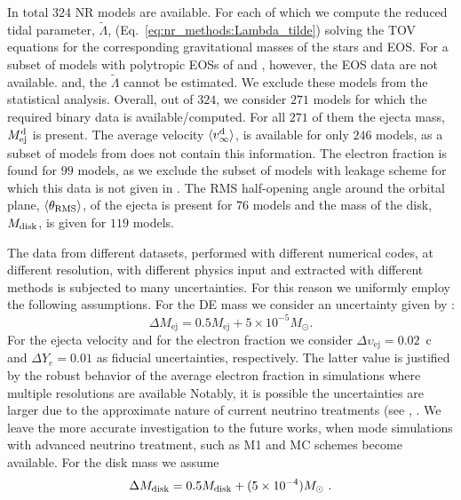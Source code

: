 In total $324$ \ac{NR} models are available.
For each of which we compute the reduced tidal parameter, $\tilde{\Lambda}$, 
(Eq.~\eqref{eq:nr_methods:Lambda_tilde}) solving the \ac{TOV} equations for the corresponding 
gravitational masses of the stars and \ac{EOS}.
% 
For a subset of models with polytropic \acp{EOS} of \citet{Bauswein:2013jpa}
and \citet{Kiuchi:2019lls}, however, the \ac{EOS} data are not available. and, 
the $\tilde{\Lambda}$ cannot be estimated. We exclude these models from the 
statistical analysis. Overall, out of $324$, we consider $271$ models for which 
the required binary data is available/computed. For all $271$ of them the ejecta 
mass, $M^{\text{d}}_{\text{ej}}$ is present. The average velocity $\langle v^{\text{d}}_\infty\rangle$, is available for only $246$ 
models, as a subset of models from \citet{Kiuchi:2019lls} does not contain this 
information. The electron fraction is found for $99$ models, as we exclude the 
subset of models with leakage scheme for which this data is not given in 
\citet{Lehner:2016lxy}. The \ac{RMS} half-opening angle around the orbital plane, 
$\langle\theta_{\rm RMS}\rangle$, of the ejecta is present for $76$ models and the mass of the disk, 
$M_{\rm disk}$, is given for $119$ models.

The data from different datasets, performed with different numerical codes, at 
different resolution, with different physics input and extracted with different 
methods is subjected to many uncertainties. 
For this reason we uniformly employ the following assumptions.
%
For the \ac{DE} mass we consider an uncertainty given by \citep{Radice:2018pdn}:
%
\begin{equation}
\Delta M_{\text{ej}} = 0.5M_{\text{ej}} + 5\times10^{-5}M_{\odot}.
\label{eq:ejecta:mej_err}
\end{equation}
%
For the ejecta velocity and for the electron fraction we consider 
$\Delta \upsilon_{\text{ej}} = 0.02$~c 
and $ \Delta Y_e = 0.01$ as fiducial uncertainties, respectively.
The latter value is justified by the robust behavior of the average electron 
fraction in simulations where multiple resolutions are available
Notably, it is possible the uncertainties are larger due to the approximate nature of current 
neutrino treatments (see \eg, \citet{Foucart:2016rxm,Foucart:2018gis}. 
We leave the more accurate investigation to the future works, when mode simulations
with advanced neutrino treatment, such as M1 and \ac{MC} schemes become available. 
%
For the disk mass we assume \citep{Radice:2018pdn}
\begin{equation}
\Delta M_{\text{disk}} = 0.5M_{\rm disk} + (5\times
10^{-4})M_{\odot}\ .
\label{eq:disk:mdisk_err}
\end{equation}


